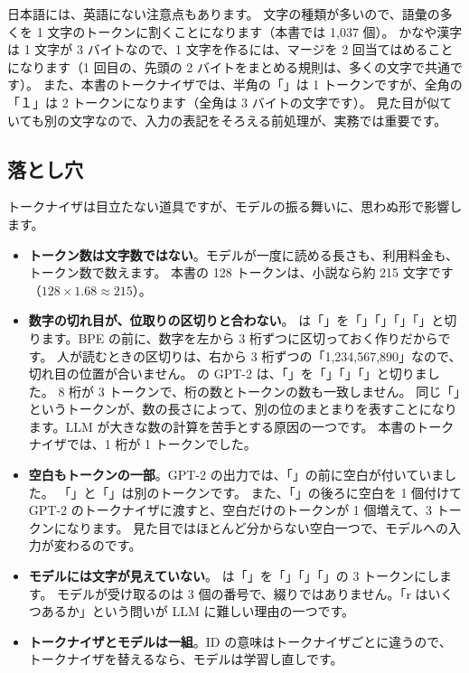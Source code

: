 日本語には、英語にない注意点もあります。
文字の種類が多いので、語彙の多くを 1 文字のトークンに割くことになります（本書では 1,037 個）。
かなや漢字は 1 文字が 3 バイトなので、1 文字を作るには、マージを 2 回当てはめることになります（1 回目の、先頭の 2 バイトをまとめる規則は、多くの文字で共通です）。
また、本書のトークナイザでは、半角の「」は 1 トークンですが、全角の「１」は 2 トークンになります（全角は 3 バイトの文字です）。
見た目が似ていても別の文字なので、入力の表記をそろえる前処理が、実務では重要です。

\subsection*{落とし穴}

トークナイザは目立たない道具ですが、モデルの振る舞いに、思わぬ形で影響します。

\begin{itemize}
\item \textbf{トークン数は文字数ではない}。モデルが一度に読める長さも、利用料金も、トークン数で数えます。
本書の 128 トークンは、小説なら約 215 文字です（$128\times1.68\approx215$）。
\item \textbf{数字の切れ目が、位取りの区切りと合わない}。 は「」を「」「」「」「」と切ります。BPE の前に、数字を左から 3 桁ずつに区切っておく作りだからです。
人が読むときの区切りは、右から 3 桁ずつの「1,234,567,890」なので、切れ目の位置が合いません。
の GPT-2 は、「」を「」「」「」と切りました。
8 桁が 3 トークンで、桁の数とトークンの数も一致しません。
同じ「」というトークンが、数の長さによって、別の位のまとまりを表すことになります。LLM が大きな数の計算を苦手とする原因の一つです。
本書のトークナイザでは、1 桁が 1 トークンでした。
\item \textbf{空白もトークンの一部}。GPT-2 の出力では、「」の前に空白が付いていました。
「」と「」は別のトークンです。
また、「」の後ろに空白を 1 個付けて GPT-2 のトークナイザに渡すと、空白だけのトークンが 1 個増えて、3 トークンになります。
見た目ではほとんど分からない空白一つで、モデルへの入力が変わるのです。
\item \textbf{モデルには文字が見えていない}。 は「」を「」「」「」の 3 トークンにします。
モデルが受け取るのは 3 個の番号で、綴りではありません。「r はいくつあるか」という問いが LLM に難しい理由の一つです。
\item \textbf{トークナイザとモデルは一組}。ID の意味はトークナイザごとに違うので、トークナイザを替えるなら、モデルは学習し直しです。
\end{itemize}

